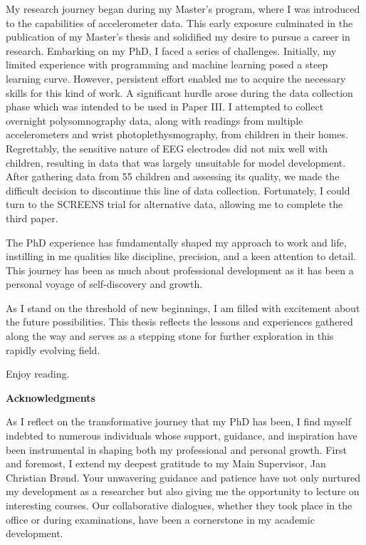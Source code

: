 My research journey began during my Master's program, where I was introduced to the capabilities of accelerometer data. This early exposure culminated in the publication of my Master's thesis and solidified my desire to pursue a career in research. Embarking on my PhD, I faced a series of challenges. Initially, my limited experience with programming and machine learning posed a steep learning curve. However, persistent effort enabled me to acquire the necessary skills for this kind of work. A significant hurdle arose during the data collection phase which was intended to be used in Paper III. I attempted to collect overnight polysomnography data, along with readings from multiple accelerometers and wrist photoplethysmography, from children in their homes. Regrettably, the sensitive nature of EEG electrodes did not mix well with children, resulting in data that was largely unsuitable for model development. After gathering data from 55 children and assessing its quality, we made the difficult decision to discontinue this line of data collection. Fortunately, I could turn to the SCREENS trial for alternative data, allowing me to complete the third paper.

The PhD experience has fundamentally shaped my approach to work and life, instilling in me qualities like discipline, precision, and a keen attention to detail. This journey has been as much about professional development as it has been a personal voyage of self-discovery and growth.

As I stand on the threshold of new beginnings, I am filled with excitement about the future possibilities. This thesis reflects the lessons and experiences gathered along the way and serves as a stepping stone for further exploration in this rapidly evolving field.

Enjoy reading.

\newpage

  
\textcolor{color1}{\textsf{\textbf{\Large{Acknowledgments}}}}

\vspace*{\baselineskip}

As I reflect on the transformative journey that my PhD has been, I find myself indebted to numerous individuals whose support, guidance, and inspiration have been instrumental in shaping both my professional and personal growth.
First and foremost, I extend my deepest gratitude to my Main Supervisor, Jan Christian Brønd. Your unwavering guidance and patience have not only nurtured my development as a researcher but also giving me the opportunity to lecture on interesting courses. Our collaborative dialogues, whether they took place in the office or during examinations, have been a cornerstone in my academic development.

